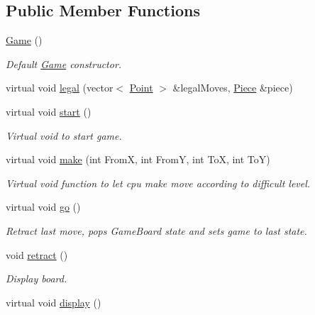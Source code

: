 \subsection*{Public Member Functions}
\begin{DoxyCompactItemize}
\item 
\hyperlink{class_game_ad59df6562a58a614fda24622d3715b65}{Game} ()
\begin{DoxyCompactList}\small\item\em Default \hyperlink{class_game}{Game} constructor. \end{DoxyCompactList}\item 
virtual void \hyperlink{class_game_acf61b27aed22684d96fbc7fa2692feeb}{legal} (vector$<$ \hyperlink{struct_point}{Point} $>$ \&legal\-Moves, \hyperlink{class_piece}{Piece} \&piece)
\item 
virtual void \hyperlink{class_game_a3d9b98f7c4a96ecf578f75b96c9f0e90}{start} ()
\begin{DoxyCompactList}\small\item\em Virtual void to start game. \end{DoxyCompactList}\item 
virtual void \hyperlink{class_game_a50b3e0e1e7a73793a9f9eae1b0660eff}{make} (int From\-X, int From\-Y, int To\-X, int To\-Y)
\begin{DoxyCompactList}\small\item\em Virtual void function to let cpu make move according to difficult level. \end{DoxyCompactList}\item 
\hypertarget{class_game_ab411d0da584724addd4fdb96fc16b9a4}{virtual void \hyperlink{class_game_ab411d0da584724addd4fdb96fc16b9a4}{go} ()}\label{class_game_ab411d0da584724addd4fdb96fc16b9a4}

\begin{DoxyCompactList}\small\item\em Retract last move, pops Game\-Board state and sets game to last state. \end{DoxyCompactList}\item 
\hypertarget{class_game_a9be0655102af94f1a37a7eaec1be36fc}{void \hyperlink{class_game_a9be0655102af94f1a37a7eaec1be36fc}{retract} ()}\label{class_game_a9be0655102af94f1a37a7eaec1be36fc}

\begin{DoxyCompactList}\small\item\em Display board. \end{DoxyCompactList}\item 
\hypertarget{class_game_a4d0223a84926cbabea95ed7e0392690a}{virtual void \hyperlink{class_game_a4d0223a84926cbabea95ed7e0392690a}{display} ()}\label{class_game_a4d0223a84926cbabea95ed7e0392690a}


\end{DoxyCompactItemize}
